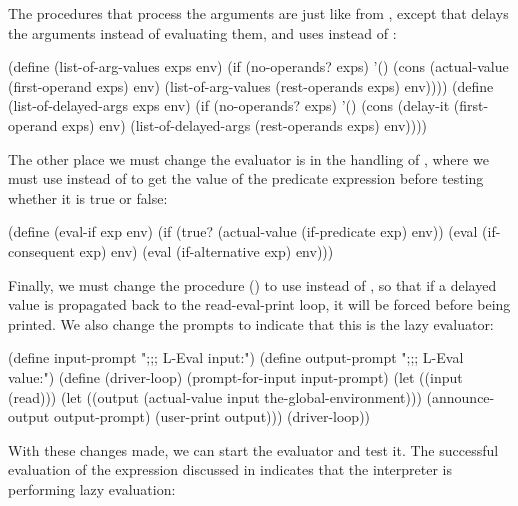 \noindent
The procedures that process the arguments are just like 
from , except that  delays the
arguments instead of evaluating them, and  uses
 instead of :

\begin{codeBlock}
(define (list-of-arg-values exps env)
  (if (no-operands? exps)
      '()
      (cons (actual-value (first-operand exps)
                          env)
            (list-of-arg-values (rest-operands exps)
                                env))))
(define (list-of-delayed-args exps env)
  (if (no-operands? exps)
      '()
      (cons (delay-it (first-operand exps)
                      env)
            (list-of-delayed-args (rest-operands exps)
                                  env))))
\end{codeBlock}

\noindent
The other place we must change the evaluator is in the handling of ,
where we must use  instead of  to get the value
of the predicate expression before testing whether it is true or false:

\begin{codeBlock}
(define (eval-if exp env)
  (if (true? (actual-value (if-predicate exp) env))
      (eval (if-consequent exp) env)
      (eval (if-alternative exp) env)))
\end{codeBlock}

\noindent
Finally, we must change the  procedure ()
to use  instead of , so that if a delayed value
is propagated back to the read-eval-print loop, it will be forced before being
printed.  We also change the prompts to indicate that this is the lazy
evaluator:

\begin{codeBlock}
(define input-prompt  ";;; L-Eval input:")
(define output-prompt ";;; L-Eval value:")
(define (driver-loop)
  (prompt-for-input input-prompt)
  (let ((input (read)))
    (let ((output
           (actual-value
            input the-global-environment)))
      (announce-output output-prompt)
      (user-print output)))
  (driver-loop))
\end{codeBlock}

\noindent
With these changes made, we can start the evaluator and test it.  The
successful evaluation of the  expression discussed in
 indicates that the interpreter is performing lazy evaluation:

